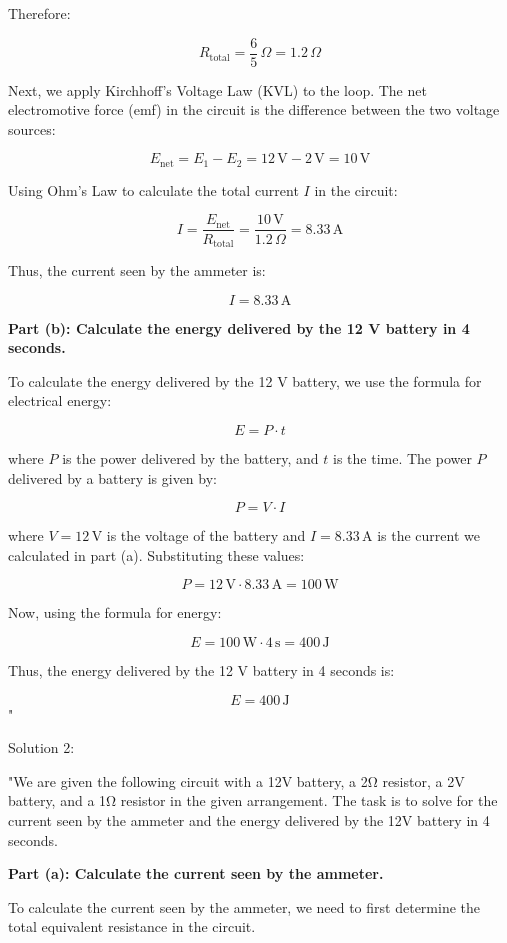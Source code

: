 Therefore:

\[
R_{\text{total}} = \frac{6}{5} \, \Omega = 1.2 \, \Omega
\]

Next, we apply Kirchhoff’s Voltage Law (KVL) to the loop. The net electromotive force (emf) in the circuit is the difference between the two voltage sources:

\[
E_{\text{net}} = E_1 - E_2 = 12 \, \text{V} - 2 \, \text{V} = 10 \, \text{V}
\]

Using Ohm’s Law to calculate the total current \( I \) in the circuit:

\[
I = \frac{E_{\text{net}}}{R_{\text{total}}} = \frac{10 \, \text{V}}{1.2 \, \Omega} = 8.33 \, \text{A}
\]

Thus, the current seen by the ammeter is:

\[
I = 8.33 \, \text{A}
\]

\textbf{Part (b): Calculate the energy delivered by the 12 V battery in 4 seconds.}

To calculate the energy delivered by the 12 V battery, we use the formula for electrical energy:

\[
E = P \cdot t
\]

where \( P \) is the power delivered by the battery, and \( t \) is the time. The power \( P \) delivered by a battery is given by:

\[
P = V \cdot I
\]

where \( V = 12 \, \text{V} \) is the voltage of the battery and \( I = 8.33 \, \text{A} \) is the current we calculated in part (a). Substituting these values:

\[
P = 12 \, \text{V} \cdot 8.33 \, \text{A} = 100 \, \text{W}
\]

Now, using the formula for energy:

\[
E = 100 \, \text{W} \cdot 4 \, \text{s} = 400 \, \text{J}
\]

Thus, the energy delivered by the 12 V battery in 4 seconds is:

\[
E = 400 \, \text{J}
\]"

Solution 2:

"We are given the following circuit with a 12V battery, a 2Ω resistor, a 2V battery, and a 1Ω resistor in the given arrangement. The task is to solve for the current seen by the ammeter and the energy delivered by the 12V battery in 4 seconds.

\textbf{Part (a): Calculate the current seen by the ammeter.}

To calculate the current seen by the ammeter, we need to first determine the total equivalent resistance in the circuit.


